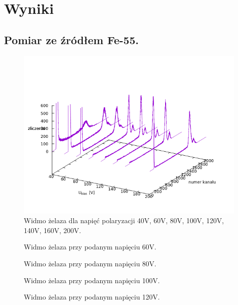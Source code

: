 \documentclass[11pt,a4paper]{article}
\begin{document}
\section{Wyniki}
\subsection{Pomiar ze źródłem Fe-55.}

\begin{figure}[H]
\centering
\includegraphics[width=.9\linewidth]{fe.png}
\caption{Widmo żelaza dla napięć polaryzacji 40V, 60V, 80V, 100V, 120V, 140V, 160V, 200V.}
\label{fig1}
\end{figure}

\begin{figure}[H]
\centering
\resizebox{.8\linewidth}{!}{}
\caption{Widmo żelaza przy podanym napięciu 60V.}
\label{fig1}
\end{figure}

\begin{figure}[H]
\centering
\resizebox{.8\linewidth}{!}{}
\caption{Widmo żelaza przy podanym napięciu 80V.}
\label{fig1}
\end{figure}

\begin{figure}[H]
\centering
\resizebox{.8\linewidth}{!}{}
\caption{Widmo żelaza przy podanym napięciu 100V.}
\label{fig1}
\end{figure}

\begin{figure}[H]
\centering
\resizebox{.8\linewidth}{!}{}
\caption{Widmo żelaza przy podanym napięciu 120V.}
\label{fig1}
\end{figure}
\end{document}
